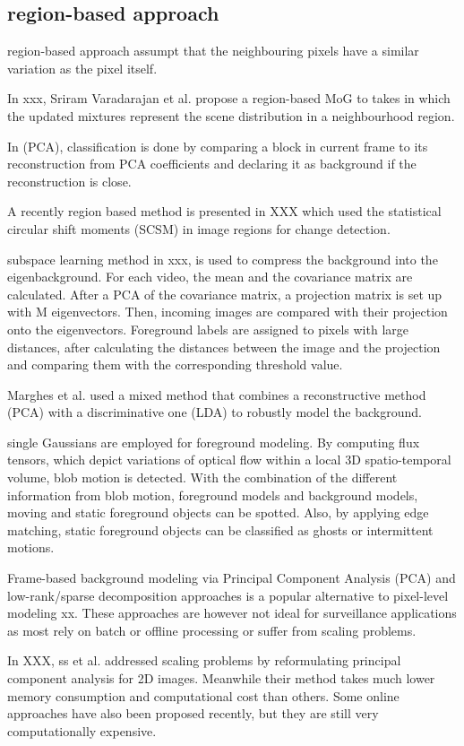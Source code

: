 \documentclass[journal]{IEEEtran}
\begin{document}
\subsection{region-based approach}
\label{sec_geo}
region-based approach assumpt that the neighbouring pixels have a similar variation as the pixel itself.

In xxx, Sriram Varadarajan et al.
propose a region-based MoG to takes in which the updated mixtures represent the scene distribution in a neighbourhood region.

In (PCA), classification is done by comparing a block in current frame to its reconstruction from PCA coefficients and declaring it as background if the reconstruction is close.

A recently region based method is presented in XXX which used the statistical circular shift moments (SCSM) in image regions for change detection.

subspace learning method in xxx, is used to compress the background into the eigenbackground.
For each video, the mean and the covariance matrix are calculated.
After a PCA of the covariance matrix, a projection matrix is set up with M eigenvectors.
Then, incoming images are compared with their projection onto the eigenvectors.
Foreground labels are assigned to pixels with large distances, after calculating the distances between the image and the projection and comparing them with the corresponding threshold value.

Marghes et al.
used a mixed method that combines a reconstructive method (PCA) with a discriminative one (LDA) to robustly model the background.

single Gaussians are employed for foreground modeling.
By computing flux tensors, which depict variations of optical flow within a local 3D spatio-temporal volume, blob motion is detected.
With the combination of the different information from blob motion, foreground models and background models, moving and static foreground objects can be spotted.
Also, by applying edge matching, static foreground objects can be classified as ghosts or intermittent motions.

Frame-based background modeling via Principal Component Analysis (PCA) and low-rank/sparse decomposition approaches is a popular alternative to pixel-level modeling xx.
These approaches are however not ideal for surveillance applications as most rely on batch or offline processing or suffer from scaling problems.

In XXX, ss et al.
addressed scaling problems by reformulating principal component analysis for 2D images.
Meanwhile their method takes much lower memory consumption and computational cost than others.
Some online approaches have also been proposed recently, but they are still very computationally expensive.
\end{document}
